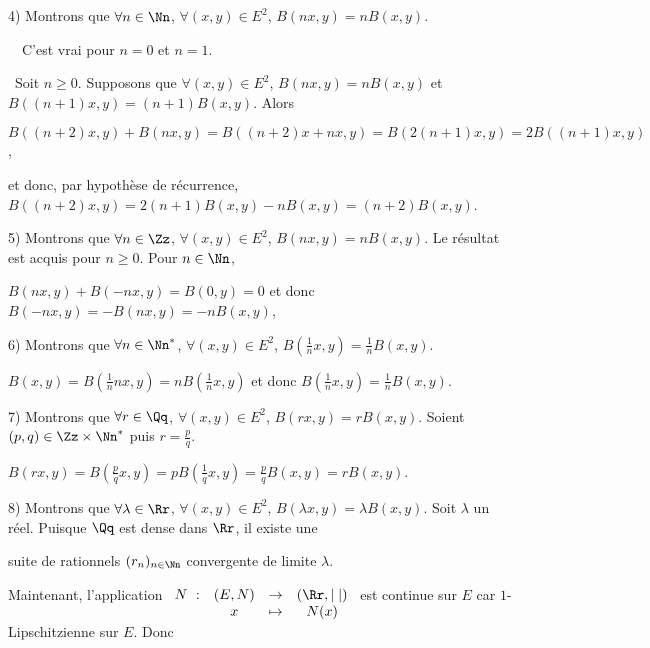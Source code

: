 {{4) Montrons que $\forall n\in\Nn$, $\forall(x,y)\in E^2$, $B(nx,y) = nB(x,y)$.

\textbullet~~C'est vrai pour $n = 0$ et $n=1$.

\textbullet~Soit $n\geqslant0$. Supposons que $\forall(x,y)\in E^2$, $B(nx,y) = nB(x,y)$ et $B((n+1)x,y) = (n+1)B(x,y)$. Alors

\begin{center}
$B((n+2)x,y) + B(nx,y) = B((n+2)x+nx,y) = B(2(n+1)x,y) = 2B((n+1)x,y)$,
\end{center}

et donc, par hypothèse de récurrence, $B((n+2)x,y)=2(n+1)B(x,y)-nB(x,y) =(n+2)B(x,y)$.

5) Montrons que $\forall n\in\Zz$, $\forall(x,y)\in E^2$, $B(nx,y) = nB(x,y)$. Le résultat est acquis pour $n\geqslant 0$. Pour $n\in\Nn$,

\begin{center}
$B(nx,y) + B(-nx,y) = B(0,y) = 0$ et donc $B(-nx,y) =- B(nx,y)=-nB(x,y)$,
\end{center}

6) Montrons que $\forall n\in\Nn^*$, $\forall(x,y)\in E^2$, $B\left(\frac{1}{n}x,y\right) =\frac{1}{n}B(x,y)$.

\begin{center}
$B(x,y) =B\left(\frac{1}{n}nx,y\right) =nB\left(\frac{1}{n}x,y\right)$ et donc $B\left(\frac{1}{n}x,y\right) =\frac{1}{n}B(x,y)$.
\end{center}

7) Montrons que $\forall r\in\Qq$, $\forall(x,y)\in E^2$, $B(rx,y) = rB(x,y)$. Soient $(p,q)\in\Zz\times\Nn^*$ puis $r=\frac{p}{q}$.

\begin{center}
$B(rx,y) = B\left(\frac{p}{q}x,y\right) =pB\left(\frac{1}{q}x,y\right)=\frac{p}{q}B(x,y) = rB(x,y)$.
\end{center}

8) Montrons que $\forall\lambda\in\Rr$, $\forall(x,y)\in E^2$, $B(\lambda x,y) =\lambda B(x,y)$. Soit $\lambda$ un réel. Puisque $\Qq$ est dense dans $\Rr$, il existe une

suite de rationnels $(r_n)_{n\in\Nn}$ convergente de limite $\lambda$.

Maintenant, l'application $\begin{array}[t]{cccc}N~:&(E,N)&\rightarrow&(\Rr,|\;|)\\
 &x&\mapsto&N(x)
 \end{array}$ est continue sur $E$ car $1$-Lipschitzienne sur $E$. Donc
 
}}
